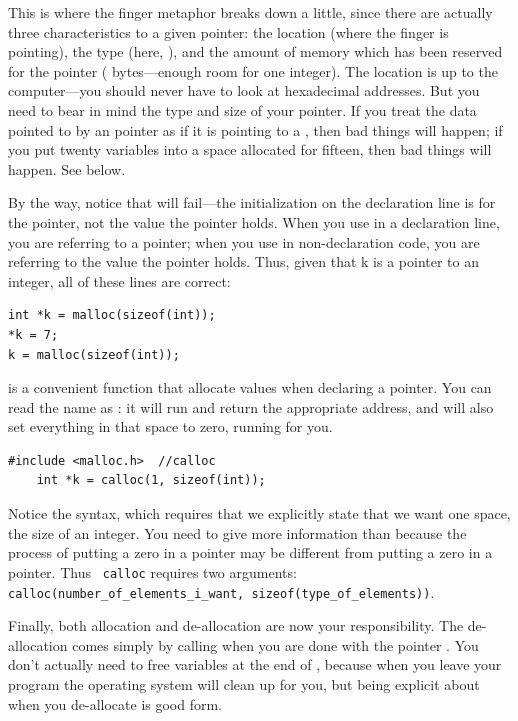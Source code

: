 This is where the finger metaphor breaks down a little, since there are actually three characteristics
to a given pointer: the location (where the finger is pointing), the type (here, ), and the
amount of memory which has been reserved for the pointer ( bytes---enough room for one
integer). The location is up to the computer---you should never have
to look at hexadecimal addresses. But you need to bear in mind the type
and size of your pointer. If you treat the data pointed to by an  pointer as if it is pointing to a , then bad things will
happen; if you put twenty variables into a space allocated for fifteen,
then bad things will happen. See below.

By the way, notice that  will fail---the initialization
on the declaration line is for the pointer, not the value the pointer
holds. When you use  in a declaration line, you are referring to
a pointer; when you use  in non-declaration code, you are
referring to the value the pointer holds.
Thus, given that k is a pointer to an integer, all of
these lines are correct:
\begin{lstlisting}
int *k = malloc(sizeof(int));
*k = 7;
k = malloc(sizeof(int)); 
\end{lstlisting}

 is a convenient function that allocate values when declaring a pointer.
You can read the name as : it will run 
and return the appropriate address, and will also set everything in
that space to zero, running  for you.
\begin{lstlisting}
#include <malloc.h>  //calloc
    int *k = calloc(1, sizeof(int));
\end{lstlisting}
Notice the syntax,
which requires that we explicitly state that we want one space, the
size of an integer. You need to give more information than 
because the process of putting a zero in a  pointer may be
different from putting a zero in a  pointer. Thus {\tt
calloc} requires two arguments: {\tt
calloc(number\_of\_elements\_i\_want, sizeof(type\_of\_elements))}.

Finally, both allocation and de-allocation are now your
responsibility. The de-allocation comes simply by calling
  when you are done with the pointer
. You don't actually need to free variables at the end of
, because when you leave your program the operating system
will clean up for you, but being explicit about when you de-allocate is
good form.

